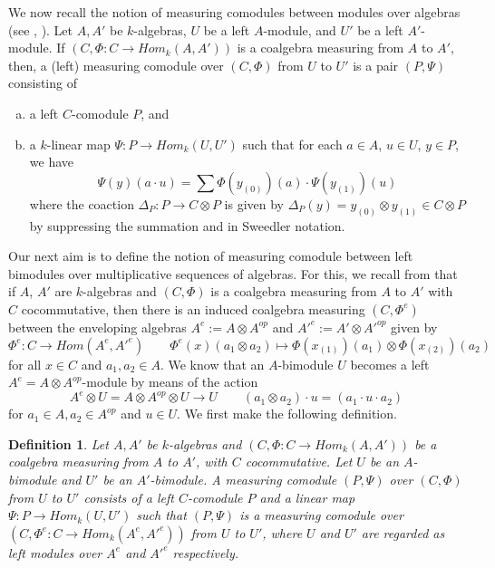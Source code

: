 \documentclass[10pt, colorlinks]{article}
\numberwithin{equation}{section} \DeclareMathSizes{2}{10}{12}{13}
\newtheorem{defn}[thm]{Definition}
\begin{document}
      We now recall the notion of measuring comodules between modules over algebras  (see \cite{MB}, \cite{MH}). Let $A,A'$ be $k$-algebras, $U$ be a left $A$-module, and $U'$ be a left $A'$-module. If $(C,\Phi:C\longrightarrow Hom_k(A,A'))$ is a coalgebra measuring from $A$ to $A'$, then, a (left) measuring comodule over $(C,\Phi)$ from $U$ to $U'$ is a pair $(P,\Psi)$ consisting of
   \begin{enumerate}[(a)]
     \item a left $C$-comodule $P$, and 
     \item a $k$-linear map $\Psi: P\longrightarrow  {Hom}_k(U,U')$ such that for each $a\in A$, $u\in U$, $y\in P$, we have
     \begin{equation*}
         \Psi(y)(a\cdot u)=\sum\Phi(y_{(0)})(a)\cdot\Psi(y_{(1)})(u)
     \end{equation*}
     where  the coaction $\Delta_P:P\longrightarrow C\otimes P$ is given by $\Delta_P(y)=y_{(0)}\otimes y_{(1)}\in C\otimes P$ by suppressing the summation and  in Sweedler notation.
 \end{enumerate} 
  Our next aim is to define the notion of measuring comodule between left bimodules over multiplicative sequences of algebras. For this, we recall from \cite[Lemma 5.4]{AB2} that if $A$, $A'$ are $k$-algebras and $(C,\Phi)$ is a coalgebra measuring from $A$ to $A'$ with $C$ cocommutative, then there is an induced coalgebra measuring $(C,\Phi^e)$ between the enveloping algebras $A^e:=A\otimes A^{op}$ and $A'^e:=A'\otimes A'^{op}$ given by
     \begin{equation}
         \Phi^e: C\longrightarrow  {Hom}(A^e,A'^e)\qquad \Phi^e(x)(a_1\otimes a_2)\longmapsto \Phi(x_{(1)})(a_1)\otimes \Phi(x_{(2)})(a_2)
     \end{equation}
     for all $x\in C$  and $a_1,a_2\in A$. We know that an $A$-bimodule  $U$ becomes a  left $A^e=A\otimes A^{op}$-module by means of the action
  \begin{equation*}
    A^e\otimes U= A\otimes A^{op}\otimes U\longrightarrow U\qquad(a_1\otimes a_2)\cdot u=(a_1\cdot u\cdot a_2) 
  \end{equation*}
  for $a_1\in A,a_2\in A^{op}$ and $u\in U$. We first make the following definition.

 
 
 \begin{defn}\label{def5.4}
   Let $A,A'$ be $k$-algebras and $(C,\Phi:C\longrightarrow Hom_k(A,A'))$ be a coalgebra measuring from $A$ to $A'$, with $C$  cocommutative. Let $U$ be an $A$-bimodule and $U'$ be an $A'$-bimodule. A  measuring comodule $(P,\Psi)$ over $(C,\Phi)$ from $U$ to $U'$ consists of a left $C$-comodule $P$ and a linear map
$
\Psi: P\longrightarrow Hom_k(U,U')
$
 such that 
     $(P,\Psi)$ is a measuring comodule over $(C,\Phi^e:C\longrightarrow Hom_k(A^e,A'^e))$ from $U$ to $U'$, where $U$ and $U'$ are regarded as left modules over $A^e$ and $A'^e$ respectively.
 \end{defn}
\smallskip
 
\end{document}
